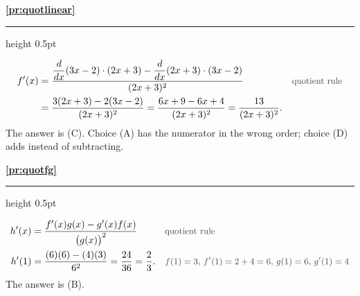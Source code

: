 \documentclass[11pt,a4paper]{article}
\newcommand{\solitem}[2]{%
 \par\addvspace{16pt}\Needspace{10\baselineskip}%
 {\large\bfseries \ref{#1}}\par\nobreak\vspace{2pt}%
 {\color{rulegray}\hrule height 0.5pt}\nobreak\vspace{7pt}%
 #2\par}
\newcommand{\why}[1]{\text{\small\color{darkgray}#1}}
\begin{document}
\solitem{pr:quotlinear}{%
\begin{align*}
f'(x)&=\frac{\dfrac{d}{dx}(3x-2)\cdot(2x+3)-\dfrac{d}{dx}(2x+3)\cdot(3x-2)}{(2x+3)^2} &&\why{quotient rule}\\
&=\frac{3(2x+3)-2(3x-2)}{(2x+3)^2}=\frac{6x+9-6x+4}{(2x+3)^2}=\frac{13}{(2x+3)^2}.
\end{align*}
The answer is (C). Choice (A) has the numerator in the wrong order; choice (D) adds instead of subtracting.
}

\solitem{pr:quotfg}{%
\begin{align*}
h'(x)&=\frac{f'(x)g(x)-g'(x)f(x)}{\bigl(g(x)\bigr)^2} &&\why{quotient rule}\\
h'(1)&=\frac{(6)(6)-(4)(3)}{6^2}=\frac{24}{36}=\frac23. &&\why{$f(1)=3$, $f'(1)=2+4=6$, $g(1)=6$, $g'(1)=4$}
\end{align*}
The answer is (B).
}
\end{document}
